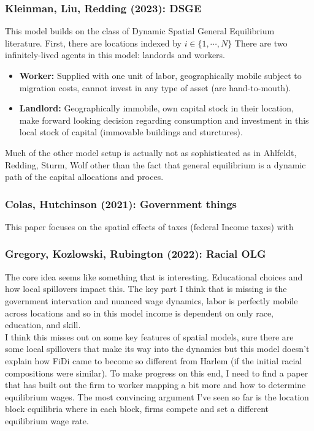 \documentclass[11pt,english]{article}
\begin{document}
\subsubsection{Kleinman, Liu, Redding (2023): DSGE\cite{Kleinman2023}}

This model builds on the class of Dynamic Spatial General Equilibrium literature. First, there are locations indexed by $i\in \{1, \cdots, N\}$ There are two infinitely-lived agents in this model: landords and workers. 
\begin{itemize}
\item \textbf{Worker:} Supplied with one unit of labor, geographically mobile subject to migration costs, cannot invest in any type of asset (are hand-to-mouth).

\item \textbf{Landlord:} Geographically immobile, own capital stock in their location, make forward looking decision regarding consumption and investment in this local stock of capital (immovable buildings and sturctures).
\end{itemize}

Much of the other model setup is actually not as sophisticated as in Ahlfeldt, Redding, Sturm, Wolf other than the fact that general equilibrium is a dynamic path of the capital allocations and proces.

\subsubsection{Colas, Hutchinson (2021): Government things\cite{Colas2021}}

This paper focuses on the spatial effects of taxes (federal Income taxes) with 

 


\subsubsection{Gregory, Kozlowski, Rubington (2022): Racial OLG\cite{Rubington2022}}

The core idea seems like something that is interesting. Educational choices and how local spillovers impact this. The key part I think that is missing is the government intervation and nuanced wage dynamics, labor is perfectly mobile across locations and so in this model income is dependent on only race, education, and skill. \\

\noindent I think this misses out on some key features of spatial models, sure there are some local spillovers that make its way into the dynamics but this model doesn't explain how FiDi came to become so different from Harlem (if the initial racial compositions were similar). To make progress on this end, I need to find a paper that has built out the firm to worker mapping a bit more and how to determine equilibrium wages. The most convincing argument I've seen so far is the location block equilibria where in each block, firms compete and set a different equilibrium wage rate.\\
\end{document}
